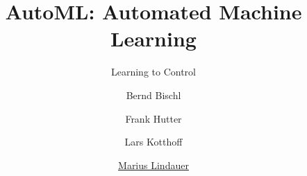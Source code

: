 




\title[AutoML: Learning to Control]{AutoML: Automated Machine Learning}
\subtitle{Learning to Control}
\author[Marius Lindauer]{Bernd Bischl \and Frank Hutter \and Lars Kotthoff \and \underline{Marius Lindauer}}
\institute{}
\date{}





	
	\maketitle
	

